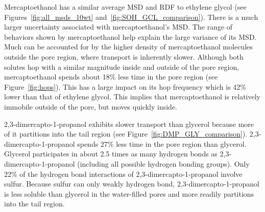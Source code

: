 \documentclass[journal=jpcbfk,manuscript=article]{achemso}
\begin{document}
  Mercaptoethanol has a similar average MSD and RDF to ethylene glycol
  (see Figures~\ref{fig:all_msds_10wt} and~\ref{fig:SOH_GCL_comparison}).
  There is a much larger uncertainty associated with mercaptoethanol's
  MSD. The range of behaviors shown by mercaptoethanol help explain the
  large variance of its MSD. Much can be accounted for by the higher 
  density of mercaptoethanol molecules outside the pore region, where 
  transport is inherently slower. Although both solutes
  hop with a similar magnitude inside and outside of the pore region, mercaptoethanol 
  spends about 18\% less time in the pore region (see Figure~\ref{fig:hops}).
  This has a large impact on its hop frequency which is 42\% lower than that 
  of ethylene glycol. This implies that mercaptoethanol is relatively
  immobile outside of the pore, but moves quickly inside.

  
  2,3-dimercapto-1-propanol exhibits slower transport than glycerol 
  because more of it partitions into the tail region (see 
  Figure~\ref{fig:DMP_GLY_comparison}). 2,3-dimercapto-1-propanol
  spends 27\% less time in the pore region than glycerol. 
  Glycerol participates in about 2.5 times as many hydrogen
  bonds as 2,3-dimercapto-1-propanol (including all possible hydrogen bonding groups).  %
  Only 22\% of the hydrogen bond interactions of 2,3-dimercapto-1-propanol
  involve sulfur. Because sulfur can only weakly hydrogen bond, 
  2,3-dimercapto-1-propanol is less soluble than glycerol in the water-filled
  pores and more readily partitions into the tail region.
  
\end{document}
